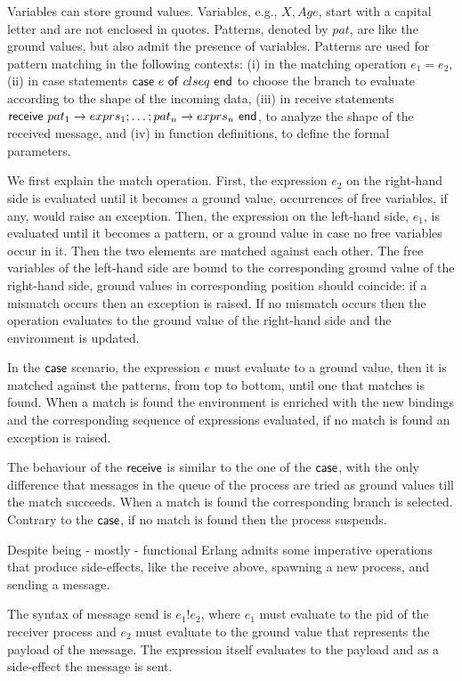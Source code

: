 \documentclass{article}[12pt,a4paper]
\theoremstyle{definition}
\begin{document}
Variables can store ground values. Variables, e.g., $X,Age$, start with a capital letter and
are not enclosed in quotes.
Patterns, denoted by $pat$, are like the ground values,
but also admit the presence of variables. Patterns are used for pattern matching in the following contexts: (i) in the matching operation $e_1 = e_2$, (ii) in case statements $\mathsf{case}~e~\mathsf{of}~clseq~\mathsf{end}$ to choose the branch
to evaluate according to the shape of the incoming data,
(iii) in receive
statements $\mathsf{receive}~pat_1 \rightarrow exprs_1; \ldots; pat_n
\rightarrow exprs_n~\mathsf{end}$, to analyze the shape of the received message, and
(iv) in function
definitions, to define the formal parameters. 

We first explain the match operation. First, the expression $e_2$ on
the right-hand side is evaluated until it becomes a ground value,
occurrences of free variables, if any, would raise an exception.
Then, the expression on the left-hand side, $e_1$, is evaluated until
it becomes a pattern, or a ground value in case no free variables
occur in it. Then the
two elements are matched against each other. The free variables of the
left-hand side are bound to the corresponding ground value of the right-hand
side, ground values in corresponding position should coincide: if a mismatch occurs then an exception
is raised. If no mismatch occurs then the operation evaluates to the ground
value of the right-hand side and the environment is updated.

In the $\mathsf{case}$ scenario, the expression $e$ must evaluate to a ground value, then it is matched against the patterns, from
top to bottom, until one that matches is found. When a match is found the environment
is enriched with the new bindings and the corresponding sequence of expressions evaluated, if
no match is found an exception is raised.

The behaviour of the $\mathsf{receive}$ is similar to the one of the
$\mathsf{case}$, with the only difference that messages in the queue of
the process are tried as ground values till the match succeeds.
When a match is found the corresponding branch
is selected.  Contrary to the $\mathsf{case}$, if no match is found
then the process suspends.

Despite being - mostly - functional Erlang
admits some imperative operations that produce side-effects, like the receive
above, spawning a new process, and sending a message. 

The syntax of message send is $e_1!e_2$, where $e_1$ must
evaluate to the pid of the receiver process and $e_2$ must evaluate to the ground value that represents the payload of the message. The expression itself evaluates to
the payload and as a side-effect the message is sent.
\end{document}
